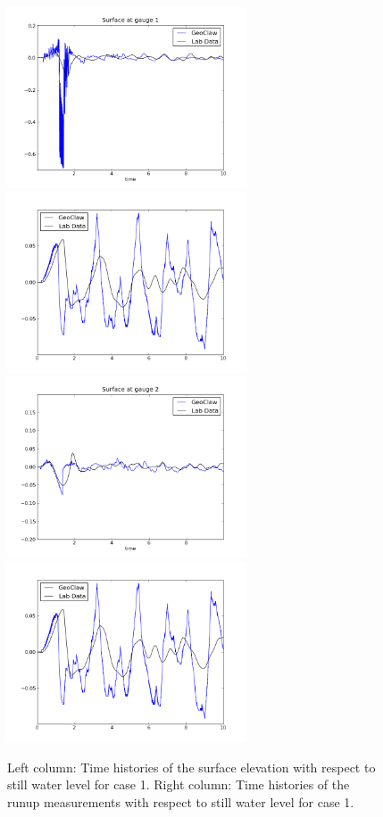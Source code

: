 \begin{figure}[ht]
\hfil\includegraphics[width=2.8in]{bp12/case1wavegauge1.png}\hfil
\hfil\includegraphics[width=2.8in]{bp12/case1runupgauge2.png}\hfil
\vskip 5pt
\hfil\includegraphics[width=2.8in]{bp12/case1wavegauge2.png}\hfil
\hfil\includegraphics[width=2.8in]{bp12/case1runupgauge2.png}\hfil
\caption{\label{fig:bp8gauges1}
Left column: Time histories of the surface elevation with respect to still
water level for case 1.
Right column: Time histories of the runup measurements with respect
to still water level for case 1.
  }
\end{figure}


